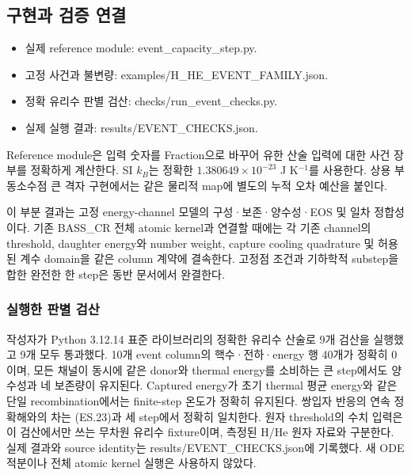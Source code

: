 \hypertarget{uxad6cuxd604uxacfc-uxac80uxc99d-uxc5f0uxacb0}{%
\subsection{구현과 검증 연결}\label{uxad6cuxd604uxacfc-uxac80uxc99d-uxc5f0uxacb0}}

\begin{itemize}
\tightlist
\item
  실제 reference module: event\_capacity\_step.py.
\item
  고정 사건과 불변량: examples/H\_HE\_EVENT\_FAMILY.json.
\item
  정확 유리수 판별 검산: checks/run\_event\_checks.py.
\item
  실제 실행 결과: results/EVENT\_CHECKS.json.
\end{itemize}

Reference module은 입력 숫자를 Fraction으로 바꾸어 유한 산술 입력에 대한 사건 장부를 정확하게 계산한다. SI \(k_B\)는 정확한 \(1.380649\times10^{-23}\) J K\(^{-1}\)를 사용한다. 상용 부동소수점 큰 격자 구현에서는 같은 물리적 map에 별도의 누적 오차 예산을 붙인다.

이 부분 결과는 고정 energy-channel 모델의 구성·보존·양수성·EOS 및 일차 정합성이다. 기존 BASS\_CR 전체 atomic kernel과 연결할 때에는 각 기존 channel의 threshold, daughter energy와 number weight, capture cooling quadrature 및 허용된 계수 domain을 같은 column 계약에 결속한다. 고정점 조건과 기하학적 substep을 합한 완전한 한 step은 동반 문서에서 완결한다.

\hypertarget{uxc2e4uxd589uxd55c-uxd310uxbcc4-uxac80uxc0b0}{%
\subsubsection{실행한 판별 검산}\label{uxc2e4uxd589uxd55c-uxd310uxbcc4-uxac80uxc0b0}}

작성자가 Python 3.12.14 표준 라이브러리의 정확한 유리수 산술로 9개 검산을 실행했고 9개 모두 통과했다. 10개 event column의 핵수·전하·energy 행 40개가 정확히 0이며, 모든 채널이 동시에 같은 donor와 thermal energy를 소비하는 큰 step에서도 양수성과 네 보존량이 유지된다. Captured energy가 초기 thermal 평균 energy와 같은 단일 recombination에서는 finite-step 온도가 정확히 유지된다. 쌍입자 반응의 연속 정확해와의 차는 (ES.23)과 세 step에서 정확히 일치한다. 원자 threshold의 수치 입력은 이 검산에서만 쓰는 무차원 유리수 fixture이며, 측정된 H/He 원자 자료와 구분한다. 실제 결과와 source identity는 results/EVENT\_CHECKS.json에 기록했다. 새 ODE 적분이나 전체 atomic kernel 실행은 사용하지 않았다.

